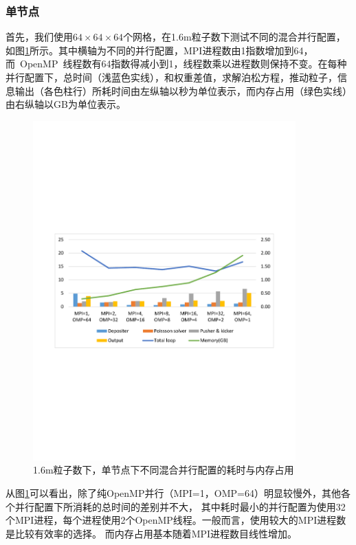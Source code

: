 \subsubsection{单节点}
首先，我们使用$64 \times 64 \times 64$个网格，在1.6m粒子数下测试不同的混合并行配置，如图\ref{fig:PIC_speedup_Cori_1node_1_6m}所示。其中横轴为不同的并行配置，MPI进程数由1指数增加到64，而~OpenMP~线程数有64指数得减小到1，线程数乘以进程数则保持不变。在每种并行配置下，总时间（浅蓝色实线），和权重差值，求解泊松方程，推动粒子，信息输出（各色柱行）所耗时间由左纵轴以秒为单位表示，而内存占用（绿色实线）由右纵轴以GB为单位表示。

\begin{figure}[!htb]
  \centering
  \includegraphics[width=0.9\textwidth]{Img/PIC_speedup_Cori_1node_1_6m.pdf}
  \caption{1.6m粒子数下，单节点下不同混合并行配置的耗时与内存占用}
  \label{fig:PIC_speedup_Cori_1node_1_6m}
\end{figure}

从图\ref{fig:PIC_speedup_Cori_1node_1_6m}可以看出，除了纯OpenMP并行（MPI=1，OMP=64）明显较慢外，其他各个并行配置下所消耗的总时间的差别并不大，
其中耗时最小的并行配置为使用32个MPI进程，每个进程使用2个OpenMP线程。一般而言，使用较大的MPI进程数是比较有效率的选择。
而内存占用基本随着MPI进程数目线性增加。

